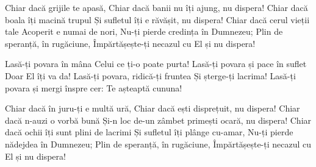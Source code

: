\beginverse
Chiar dacă grijile te apasă,
Chiar dacă banii nu îți ajung, nu dispera!
Chiar dacă boala îți macină trupul
Și sufletul îți e răvășit, nu dispera!
Chiar dacă cerul vieții tale
Acoperit e numai de nori,
Nu-ți pierde credința în Dumnezeu;
Plin de speranță, în rugăciune,
Împărtășește-ți necazul cu El și nu dispera!
\endverse

\beginchorus
Lasă-ți povara în mâna
Celui ce ți-o poate purta!
Lasă-ți povara și pace în suflet
Doar El îți va da!
Lasă-ți povara, ridică-ți fruntea
Și șterge-ți lacrima!
Lasă-ți povara și mergi înspre cer:
Te așteaptă cununa!
\endchorus

\beginverse
Chiar dacă în juru-ți e multă ură,
Chiar dacă ești disprețuit, nu dispera!
Chiar dacă n-auzi o vorbă bună
Și-n loc de-un zâmbet primești ocară, nu dispera!
Chiar dacă ochii îți sunt plini de lacrimi
Și sufletul îți plânge cu-amar,
Nu-ți pierde nădejdea în Dumnezeu;
Plin de speranță, în rugăciune,
Împărtășește-ți necazul cu El și nu dispera!
\endverse
\endsong